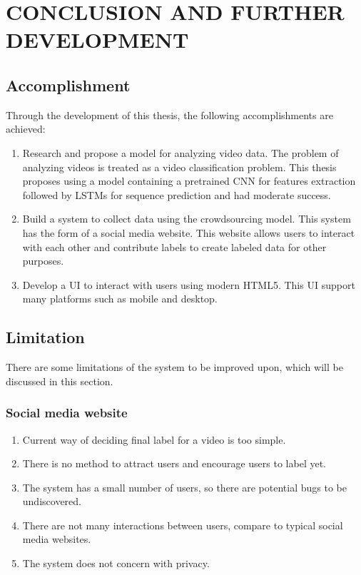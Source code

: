 \chapter{CONCLUSION AND FURTHER DEVELOPMENT}

\section{Accomplishment}
Through the development of this thesis, the following accomplishments are achieved:
\begin{enumerate}
    \item Research and propose a model for analyzing video data. The problem of analyzing videos is treated as a video classification problem. This thesis proposes using a model containing a pretrained CNN for features extraction followed by LSTMs for sequence prediction and had moderate success.
    \item Build a system to collect data using the crowdsourcing model. This system has the form of a social media website. This website allows users to interact with each other and contribute labels to create labeled data for other purposes.
    \item Develop a UI to interact with users using modern HTML5. This UI support many platforms such as mobile and desktop.
\end{enumerate}


\section{Limitation}
There are some limitations of the system to be improved upon, which will be discussed in this section.
\subsection{Social media website}
\begin{enumerate}

\item Current way of deciding final label for a video is too simple.
\item There is no method to attract users and encourage users to label yet.
\item The system has a small number of users, so there are potential bugs to be undiscovered.
\item There are not many interactions between users, compare to typical social media websites. 
\item The system does not concern with privacy.
 
\end{enumerate}
